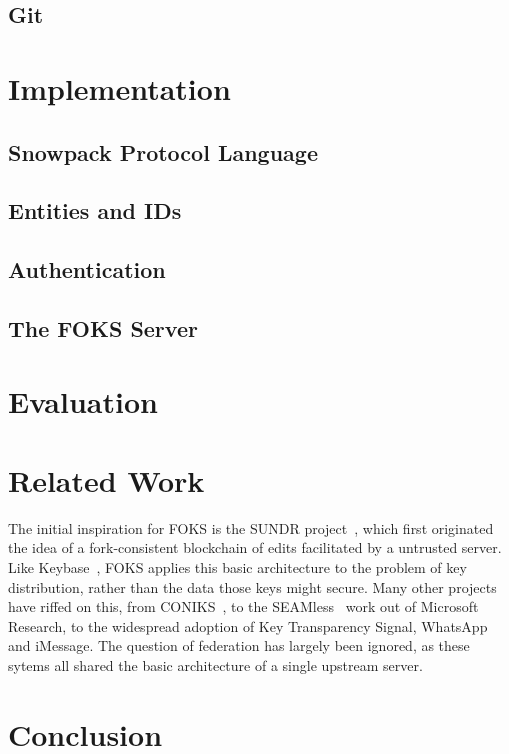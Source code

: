 \documentclass[11pt]{article}
\begin{document}
\subsection{Git}

\section{Implementation}

\subsection{Snowpack Protocol Language}

\subsection{Entities and IDs}
\label{sec:ids}

\subsection{Authentication}
\label{sec:authentication}

\subsection{The FOKS Server}
\label{sec:foks-server}

\section{Evaluation}

\section{Related Work}

The initial inspiration for FOKS is the SUNDR project~\cite{sundr}, which first
originated the idea of a fork-consistent blockchain of edits facilitated by a
untrusted server.  Like Keybase~\cite{keybase}, FOKS applies this basic
architecture to the problem of key distribution, rather than the data those keys
might secure. Many other projects have riffed on this, from
CONIKS~\cite{melara2015coniks}, to the SEAMless~\cite{chase2019seemless} work
out of Microsoft Research, to the widespread adoption of Key Transparency
Signal, WhatsApp and iMessage.  The question of federation has largely been
ignored, as these sytems all shared the basic architecture of a single upstream
server.

\section{Conclusion}



\end{document}

